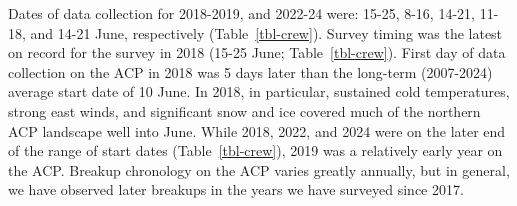 \documentclass[
]{article}
\begin{document}
Dates of data collection for 2018-2019, and 2022-24 were: 15-25, 8-16,
14-21, 11-18, and 14-21 June, respectively (Table~\ref{tbl-crew}).
Survey timing was the latest on record for the survey in 2018 (15-25
June; Table~\ref{tbl-crew}). First day of data collection on the ACP in
2018 was 5 days later than the long-term (2007-2024) average start date
of 10 June. In 2018, in particular, sustained cold temperatures, strong
east winds, and significant snow and ice covered much of the northern
ACP landscape well into June. While 2018, 2022, and 2024 were on the
later end of the range of start dates (Table~\ref{tbl-crew}), 2019 was a
relatively early year on the ACP. Breakup chronology on the ACP varies
greatly annually, but in general, we have observed later breakups in the
years we have surveyed since 2017.

\begingroup\fontsize{10}{12}\selectfont
\end{document}
